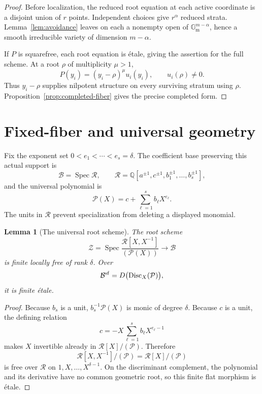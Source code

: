 \documentclass[11pt]{article}
\newcommand{\Gm}{\mathbb{G}_{\mathrm m}}
\newcommand{\Q}{\mathbb{Q}}
\newcommand{\Spec}{\operatorname{Spec}}
\newtheorem{lemma}{Lemma}[section]
\theoremstyle{remark}
\numberwithin{equation}{section}
\begin{document}
\begin{proof}
Before localization, the reduced root equation at each active coordinate is a disjoint union of \(r\) points.  Independent choices give \(r^\alpha\) reduced strata.  Lemma~\ref{lem:avoidance} leaves on each a nonempty open of \(\Gm^{m-\alpha}\), hence a smooth irreducible variety of dimension \(m-\alpha\).

If \(P\) is squarefree, each root equation is étale, giving the assertion for the full scheme.  At a root \(\rho\) of multiplicity \(\mu>1\),
\[
 P(y_i)=(y_i-\rho)^\mu u_i(y_i),\qquad u_i(\rho)\neq0.
\]
Thus \(y_i-\rho\) supplies nilpotent structure on every surviving stratum using \(\rho\).  Proposition~\ref{prop:completed-fiber} gives the precise completed form.
\end{proof}


\section{Fixed-fiber and universal geometry}\label{sec:universal-family}

Fix the exponent set \(0<e_1<\cdots<e_s=\delta\).  The coefficient base preserving this actual support is
\[
 \mathcal B=\Spec\mathcal R,\qquad
 \mathcal R=\Q[a^{\pm1},c^{\pm1},b_1^{\pm1},\ldots,b_s^{\pm1}],
\]
and the universal polynomial is
\[
 \mathcal P(X)=c+\sum_{\ell=1}^{s}b_\ell X^{e_\ell}.
\]
The units in \(\mathcal R\) prevent specialization from deleting a displayed monomial.

\begin{lemma}[The universal root scheme]\label{lem:universal-root}
The root scheme
\[
 \mathcal Z=\Spec
 \frac{\mathcal R[X,X^{-1}]}{(\mathcal P(X))}
 \longrightarrow\mathcal B
\]
is finite locally free of rank \(\delta\).  Over
\[
 \mathcal B^{\rm sf}
 =D\bigl(\operatorname{Disc}_X(\mathcal P)\bigr),
\]
it is finite étale.
\end{lemma}

\begin{proof}
Because \(b_s\) is a unit, \(b_s^{-1}\mathcal P(X)\) is monic of degree \(\delta\).  Because \(c\) is a unit, the defining relation
\[
 c=-X\sum_{\ell=1}^{s}b_\ell X^{e_\ell-1}
\]
makes \(X\) invertible already in \(\mathcal R[X]/(\mathcal P)\).  Therefore
\[
 \mathcal R[X,X^{-1}]/(\mathcal P)
 =\mathcal R[X]/(\mathcal P)
\]
is free over \(\mathcal R\) on \(1,X,\ldots,X^{\delta-1}\).  On the discriminant complement, the polynomial and its derivative have no common geometric root, so this finite flat morphism is étale.
\end{proof}
\end{document}
